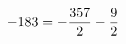 \documentclass[preview]{standalone}
\begin{document}
\begin{align*}
\special{dvisvgm:raw <g id='unique000'>}-183 = - \frac{357}{2} - \frac{9}{2}\special{dvisvgm:raw </g>}
\end{align*}
\end{document}
